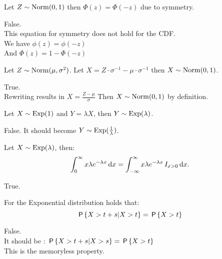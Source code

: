 \documentclass[tf-tutorial-all.tex]{subfiles}
\begin{document}
\begin{truefalse}
Let $Z \sim \Norm{0,1}$ then $\Phi(z) = \Phi(-z)$ due to symmetry.
\begin{solution}
False.\\
This equation for symmetry does not hold for the CDF. \\
We have $\phi(z) = \phi(-z)$
\\And $\Phi(z) = 1 - \Phi(-z)$
\end{solution}
\end{truefalse}

\begin{truefalse}
Let $Z \sim \Norm{\mu, \sigma^{2}}$. Let $X = Z \cdot \sigma^{-1} - \mu \cdot \sigma^{-1}$ then $X \sim \Norm{0,1}$.
\begin{solution}
True.
\\Rewriting results in $X = \frac{Z - \mu}{\sigma} $ Then $ X \sim \Norm{0,1}$ by definition.
\end{solution}
\end{truefalse}

\begin{truefalse}
Let $X \sim \Exp{1}$ and $Y = \lambda X$, then $Y \sim \Exp{\lambda}$.
\begin{solution}
False. It should become $Y \sim \Exp{\frac{1}{\lambda}}$.
\end{solution}
\end{truefalse}

\begin{truefalse}
Let $X \sim \Exp{\lambda}$, then:
$$ \int^{\infty}_{0} x  \lambda e^{ - \lambda x} \d x  =  \int^{\infty}_{- \infty} x \lambda e^{ - \lambda x} \1{x> 0}\d x.$$
\begin{solution}
True.\\
\end{solution}
\end{truefalse}

\begin{truefalse}
For the Exponential distribution holds that:
$$\P{X > t + s | X > t} = \P{X > t}$$
\begin{solution}
 False.
 \\It should be :
$\P{X > t + s | X > s} = \P{X > t}$
\\This is the memoryless property.
\end{solution}
\end{truefalse}
\end{document}
